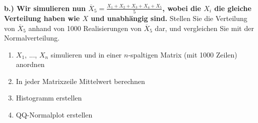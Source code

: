 \documentclass[11pt]{article}
\providecommand{\tightlist}{%
      \setlength{\itemsep}{0pt}\setlength{\parskip}{0pt}}
\begin{document}
    \begin{center}
    \end{center}
    { \hspace*{\fill} \\}
    
    \textbf{b.) Wir simulieren nun
\(\overline{X}_5 = \frac{X_1+X_2+X_3+X_4+X_5}{5}\), wobei die \(X_i\)
die gleiche Verteilung haben wie \(X\) und unabhängig sind.} Stellen Sie
die Verteilung von \(\overline{X}_5\) anhand von 1000 Realisierungen von
\(\overline{X}_5\) dar, und vergleichen Sie mit der Normalverteilung.

\begin{enumerate}
\def\labelenumi{\arabic{enumi}.}
\tightlist
\item
  \(X_1\), ..., \(X_n\) simulieren und in einer \(n\)-spaltigen Matrix
  (mit 1000 Zeilen) anordnen
\item
  In jeder Matrixzeile Mittelwert berechnen
\item
  Histogramm erstellen
\item
  QQ-Normalplot erstellen
\end{enumerate}
\end{document}
